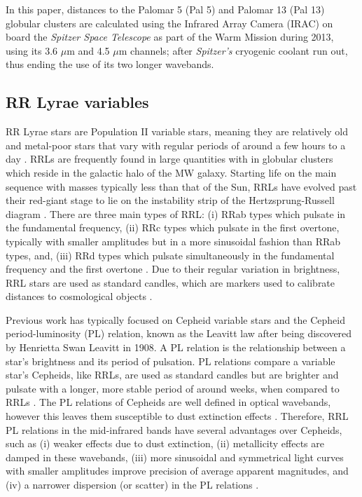 \documentclass[11pt]{iopart}
\begin{document}
In this paper, distances to the Palomar 5 (Pal 5) and Palomar 13 (Pal 13) globular clusters are calculated using the Infrared Array Camera (IRAC) on board the \textit{Spitzer Space Telescope} as part of the Warm Mission during 2013, using its 3.6 $\mu$m and 4.5 $\mu$m channels; after \textit{Spitzer's} cryogenic coolant run out, thus ending the use of its two longer wavebands.

\subsection{RR Lyrae variables}
\label{rrls}
RR Lyrae stars are Population II variable stars, meaning they are relatively old and metal-poor stars that vary with regular periods of around a few hours to a day \cite{beaton2016}. RRLs are frequently found in large quantities with in globular clusters which reside in the galactic halo of the MW galaxy. Starting life on the main sequence with masses typically less than that of the Sun, RRLs have evolved past their red-giant stage to lie on the instability strip of the Hertzsprung-Russell diagram \cite{muraveva2020}. There are three main types of RRL: (i) RRab types which pulsate in the fundamental frequency, (ii) RRc types which pulsate in the first overtone, typically with smaller amplitudes but in a more sinusoidal fashion than RRab types, and, (iii) RRd types which pulsate simultaneously in the fundamental frequency and the first overtone \cite{monson2017}. Due to their regular variation in brightness, RRL stars are used as standard candles, which are markers used to calibrate distances to cosmological objects \cite{garofalo2018smhash}.

Previous work has typically focused on Cepheid variable stars and the Cepheid period-luminosity (PL) relation, known as the Leavitt law after being discovered by Henrietta Swan Leavitt in 1908. A PL relation is the relationship between a star's brightness and its period of pulsation. PL relations compare a variable star's Cepheids, like RRLs, are used as standard candles but are brighter and pulsate with a longer, more stable period of around weeks, when compared to RRLs \cite{beaton2016}. The PL relations of Cepheids are well defined in optical wavebands, however this leaves them susceptible to dust extinction effects \cite{scowcroft2011}. Therefore, RRL PL relations in the mid-infrared bands have several advantages over Cepheids, such as (i) weaker effects due to dust extinction, (ii) metallicity effects are damped in these wavebands, (iii) more sinusoidal and symmetrical light curves with smaller amplitudes improve precision of average apparent magnitudes, and (iv) a narrower dispersion (or scatter) in the PL relations \cite{garofalo2018smhash, beaton2016}. 
\end{document}
